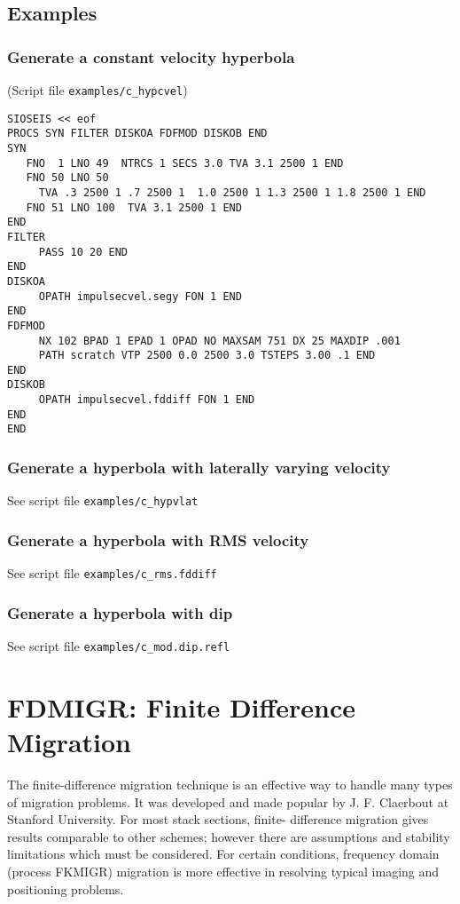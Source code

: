 \subsection{Examples}

\subsubsection{Generate a constant velocity hyperbola}
(Script file \texttt{examples/c\_hypcvel})
\begin{verbatim}
SIOSEIS << eof
PROCS SYN FILTER DISKOA FDFMOD DISKOB END
SYN
   FNO  1 LNO 49  NTRCS 1 SECS 3.0 TVA 3.1 2500 1 END
   FNO 50 LNO 50
     TVA .3 2500 1 .7 2500 1  1.0 2500 1 1.3 2500 1 1.8 2500 1 END
   FNO 51 LNO 100  TVA 3.1 2500 1 END
END
FILTER
     PASS 10 20 END
END
DISKOA
     OPATH impulsecvel.segy FON 1 END
END
FDFMOD
     NX 102 BPAD 1 EPAD 1 OPAD NO MAXSAM 751 DX 25 MAXDIP .001
     PATH scratch VTP 2500 0.0 2500 3.0 TSTEPS 3.00 .1 END
END
DISKOB
     OPATH impulsecvel.fddiff FON 1 END
END
END
\end{verbatim}

\subsubsection{Generate a hyperbola with laterally varying velocity}
     See script file \texttt{examples/c\_hypvlat}

\subsubsection{Generate a hyperbola with RMS velocity}
     See script file \texttt{examples/c\_rms.fddiff}

\subsubsection{Generate a hyperbola with dip}
     See script file \texttt{examples/c\_mod.dip.refl}

\section{FDMIGR: Finite Difference Migration}
\label{cmd_fdmigr}


The finite-difference migration technique is an effective way to handle
many types of migration problems.  It was developed and made popular by
J. F. Claerbout at Stanford University.  For most stack sections, finite-
difference migration gives results comparable to other schemes; however
there are assumptions and stability limitations which must be considered.
For certain conditions, frequency domain (process FKMIGR) migration is
more effective in resolving typical imaging and positioning problems.

